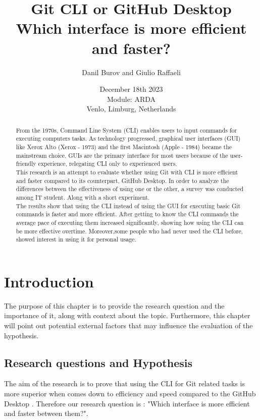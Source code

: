 \documentclass[]{report}
\title{Git CLI or GitHub Desktop \\ Which interface is more efficient and faster?}
\author{Danil Burov and Giulio Raffaeli}
\date{December 18th 2023\\Module: ARDA \\Venlo, Limburg, Netherlands}
\begin{document}
	
	\maketitle
	
	\begin{abstract}
		From the 1970s, Command Line System (CLI) enables users to input commands for executing computers tasks. As technology progressed, graphical user interfaces (GUI) like Xerox Alto (Xerox - 1973) and the first Macintosh (Apple - 1984) became the mainstream choice. GUIs are the primary interface for most users because of the user-friendly experience, relegating CLI only to experienced users.\\
		This research is an attempt to evaluate whether using Git with CLI is more efficient and faster compared to its counterpart, GitHub Desktop. In order to analyze the  differences between the effectiveness of using one or the other, a survey was conducted among IT student. Along with a short experiment.\\		
		The results show that using the CLI instead of using the GUI for executing basic Git commands is faster and more efficient.   After getting to know the CLI commands the average pace of executing them increased significantly, showing how using the CLI can be more effective overtime. Moreover,some people who had never used the CLI before, showed interest in using it for personal usage.
		
	\end{abstract}
	\tableofcontents
	\setcounter{page}{3}
	\listoffigures %
	\pagebreak
	
	
	\section{Introduction}
	The purpose of this chapter is to provide the research question and the importance of it, along with context about the topic. Furthermore, this chapter will point out potential external factors that may influence the evaluation of the hypothesis. \\
	\subsection{Research questions and Hypothesis}
	The aim of the research is to prove that using the CLI for Git related tasks is more superior when comes down to efficiency and speed compared to the GitHub Desktop . Therefore our research question is : "Which interface is more efficient and faster between them?".\\
	
\end{document}
